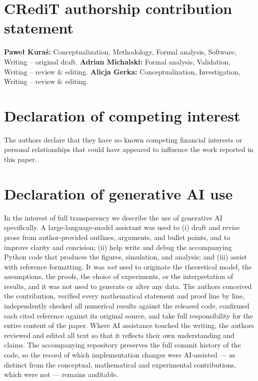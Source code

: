 \documentclass[11pt]{article}
\begin{document}
\section*{CRediT authorship contribution statement}
\textbf{Pawe\l{} Kura\'s:} Conceptualization, Methodology, Formal analysis, Software, Writing -- original draft. \textbf{Adrian Michalski:} Formal analysis, Validation, Writing -- review \& editing. \textbf{Alicja Gerka:} Conceptualization, Investigation, Writing -- review \& editing.

\section*{Declaration of competing interest}
The authors declare that they have no known competing financial interests or personal relationships that could have appeared to influence the work reported in this paper.

\section*{Declaration of generative AI use}
In the interest of full transparency we describe the use of generative AI specifically. A large-language-model assistant was used to (i) draft and revise prose from author-provided outlines, arguments, and bullet points, and to improve clarity and concision; (ii) help write and debug the accompanying Python code that produces the figures, simulation, and analysis; and (iii) assist with reference formatting. It was \emph{not} used to originate the theoretical model, the assumptions, the proofs, the choice of experiments, or the interpretation of results, and it was not used to generate or alter any data. The authors conceived the contribution, verified every mathematical statement and proof line by line, independently checked all numerical results against the released code, confirmed each cited reference against its original source, and take full responsibility for the entire content of the paper. Where AI assistance touched the writing, the authors reviewed and edited all text so that it reflects their own understanding and claims. The accompanying repository preserves the full commit history of the code, so the record of which implementation changes were AI-assisted --- as distinct from the conceptual, mathematical and experimental contributions, which were not --- remains auditable.
\end{document}
